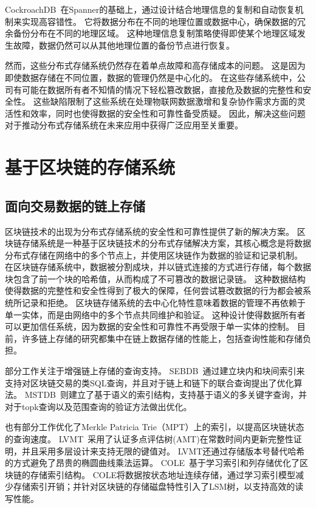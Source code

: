 CockroachDB~\cite{taft2020cockroachdb}在Spanner的基础上，通过设计结合地理信息的复制和自动恢复机制来实现高容错性。
它将数据分布在不同的地理位置或数据中心，确保数据的冗余备份分布在不同的地理区域。
这种地理信息复制策略使得即使某个地理区域发生故障，数据仍然可以从其他地理位置的备份节点进行恢复。

然而，这些分布式存储系统仍然存在着单点故障和高存储成本的问题。
这是因为即使数据存储在不同位置，数据的管理仍然是中心化的。
在这些存储系统中，公司有可能在数据所有者不知情的情况下轻松篡改数据，直接危及数据的完整性和安全性。
这些缺陷限制了这些系统在处理物联网数据激增和复杂协作需求方面的灵活性和效率，同时也使得数据的安全性和可靠性备受质疑。
因此，解决这些问题对于推动分布式存储系统在未来应用中获得广泛应用至关重要。

\section{基于区块链的存储系统}

\subsection{面向交易数据的链上存储}
区块链技术的出现为分布式存储系统的安全性和可靠性提供了新的解决方案。
区块链存储系统是一种基于区块链技术的分布式存储解决方案，其核心概念是将数据分布式存储在网络中的多个节点上，并使用区块链作为数据的验证和记录机制。
在区块链存储系统中，数据被分割成块，并以链式连接的方式进行存储，每个数据块包含了前一个块的哈希值，从而构成了不可篡改的数据记录链。
这种数据结构使得数据的完整性和安全性得到了极大的保障，任何尝试篡改数据的行为都会被系统所记录和拒绝。
区块链存储系统的去中心化特性意味着数据的管理不再依赖于单一实体，而是由网络中的多个节点共同维护和验证。
这种设计使得数据所有者可以更加信任系统，因为数据的安全性和可靠性不再受限于单一实体的控制。
目前，许多链上存储的研究都集中在链上数据存储的性能上，包括查询性能和存储负担。

部分工作关注于增强链上存储的查询支持。
SEBDB~\cite{zhu2019sebdb}通过建立块内和块间索引来支持对区块链交易的类SQL查询，并且对于链上和链下的联合查询提出了优化算法。
MSTDB~\cite{zhou2022mstdb}则建立了基于语义的索引结构，支持基于语义的多关键字查询，并对于topk查询以及范围查询的验证方法做出优化。

也有部分工作优化了Merkle Patricia Trie（MPT）上的索引，以提高区块链状态的查询速度。
LVMT~\cite{li2023lvmt}采用了认证多点评估树(AMT)在常数时间内更新完整性证明，并且采用多层设计来支持无限的键值对。
LVMT还通过存储版本号替代哈希的方式避免了昂贵的椭圆曲线乘法运算。
COLE~\cite{zhang2024cole}基于学习索引和列存储优化了区块链的存储索引结构。
COLE将数据按状态地址连续存储，通过学习索引模型减少存储索引开销；并针对区块链的存储磁盘特性引入了LSM树，以支持高效的读写性能。

